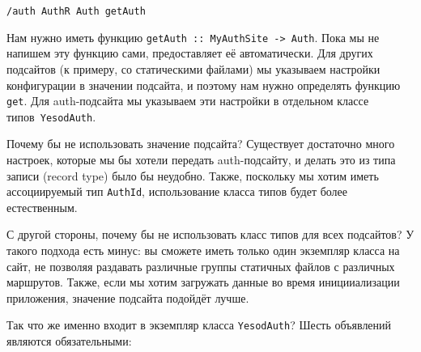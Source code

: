 \begin{lstlisting}
/auth AuthR Auth getAuth
\end{lstlisting}

Нам нужно иметь функцию \lstinline'getAuth :: MyAuthSite -> Auth'. Пока мы не напишем эту функцию сами,  предоставляет её автоматически. Для других подсайтов (к примеру, со статическими файлами) мы указываем настройки конфигурации в значении подсайта, и поэтому нам нужно определять функцию \lstinline'get'. Для auth-подсайта мы указываем эти настройки в отдельном классе типов~\lstinline'YesodAuth'.

\begin{remark}
Почему бы не использовать значение подсайта? Существует достаточно много настроек, которые мы бы хотели передать auth-подсайту, и делать это из типа записи (record type) было бы неудобно. Также, поскольку мы хотим иметь ассоциируемый тип \lstinline'AuthId', использование класса типов будет более естественным.

С другой стороны, почему бы не использовать класс типов для всех подсайтов? У такого подхода есть минус: вы сможете иметь только один экземпляр класса на сайт, не позволяя раздавать различные группы статичных файлов с различных маршрутов. Также, если мы хотим загружать данные во время иницииализации приложения, значение подсайта подойдёт лучше.
\end{remark}

Так что же именно входит в экземпляр класса \lstinline'YesodAuth'? Шесть объявлений являются обязательными:

